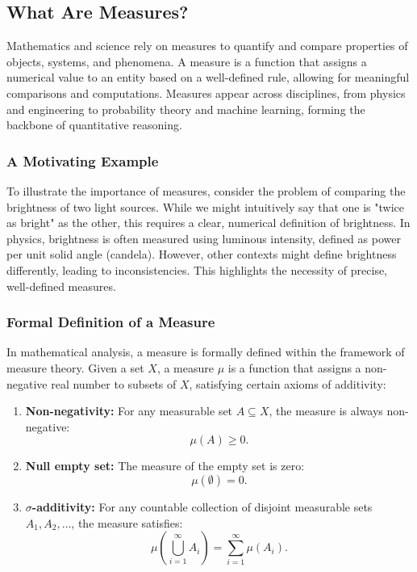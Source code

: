 \subsection{What Are Measures?}

Mathematics and science rely on measures to quantify and compare properties of objects, systems, and phenomena. A measure is a function that assigns a numerical value to an entity based on a well-defined rule, allowing for meaningful comparisons and computations. Measures appear across disciplines, from physics and engineering to probability theory and machine learning, forming the backbone of quantitative reasoning.

\subsubsection{A Motivating Example}

To illustrate the importance of measures, consider the problem of comparing the brightness of two light sources. While we might intuitively say that one is "twice as bright" as the other, this requires a clear, numerical definition of brightness. In physics, brightness is often measured using luminous intensity, defined as power per unit solid angle (candela). However, other contexts might define brightness differently, leading to inconsistencies. This highlights the necessity of precise, well-defined measures.


\subsubsection{Formal Definition of a Measure}

In mathematical analysis, a measure is formally defined within the framework of measure theory. Given a set \( X \), a measure \( \mu \) is a function that assigns a non-negative real number to subsets of \( X \), satisfying certain axioms of additivity:

\begin{enumerate}
    \item \textbf{Non-negativity:} For any measurable set \( A \subseteq X \), the measure is always non-negative:
    \[
    \mu(A) \geq 0.
    \]
    \item \textbf{Null empty set:} The measure of the empty set is zero:
    \[
    \mu(\emptyset) = 0.
    \]
    \item \textbf{\(\sigma\)-additivity:} For any countable collection of disjoint measurable sets \( A_1, A_2, \dots \), the measure satisfies:
    \[
    \mu\left(\bigcup_{i=1}^{\infty} A_i\right) = \sum_{i=1}^{\infty} \mu(A_i).
    \]
\end{enumerate}

